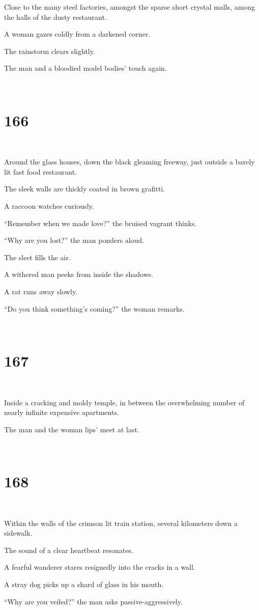 \documentclass{report}
\begin{document}
Close to the many steel factories, amongst the sparse short crystal malls, among the halls of the dusty restaurant.

A woman gazes coldly from a darkened corner.

The rainstorm clears slightly.

The man and a bloodied model bodies' touch again.

~
\chapter*{166}
~

Around the glass houses, down the black gleaming freeway, just outside a barely lit fast food restaurant.

The sleek walls are thickly coated in brown grafitti.

A raccoon watches curiously.

``Remember when we made love?'' the bruised vagrant thinks.

``Why are you lost?'' the man ponders aloud.

The sleet fills the air.

A withered man peeks from inside the shadows.

A rat runs away slowly.

``Do you think something's coming?'' the woman remarks.

~
\chapter*{167}
~

Inside a cracking and moldy temple, in between the overwhelming number of nearly infinite expensive apartments.

The man and the woman lips' meet at last.

~
\chapter*{168}
~

Within the walls of the crimson lit train station, several kilometers down a sidewalk.

The sound of a clear heartbeat resonates.

A fearful wanderer stares resignedly into the cracks in a wall.

A stray dog picks up a shard of glass in his mouth.

``Why are you veiled?'' the man asks passive-aggressively.
\end{document}
